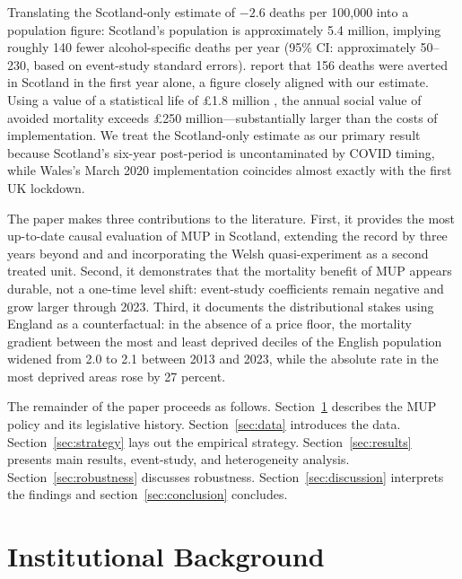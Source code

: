 \documentclass[12pt]{article}
\begin{document}
Translating the Scotland-only estimate of $-2.6$ deaths per 100,000 into a population figure: Scotland's population is approximately 5.4 million, implying roughly 140 fewer alcohol-specific deaths per year (95\% CI: approximately 50--230, based on event-study standard errors). \citet{Giles2024} report that 156 deaths were averted in Scotland in the first year alone, a figure closely aligned with our estimate. Using a value of a statistical life of \pounds{}1.8 million \citep{DFTVSLY}, the annual social value of avoided mortality exceeds \pounds{}250 million---substantially larger than the costs of implementation. We treat the Scotland-only estimate as our primary result because Scotland's six-year post-period is uncontaminated by COVID timing, while Wales's March 2020 implementation coincides almost exactly with the first UK lockdown.

The paper makes three contributions to the literature. First, it provides the most up-to-date causal evaluation of MUP in Scotland, extending the record by three years beyond \citet{ODonnell2019} and \citet{Giles2024} and incorporating the Welsh quasi-experiment as a second treated unit. Second, it demonstrates that the mortality benefit of MUP appears durable, not a one-time level shift: event-study coefficients remain negative and grow larger through 2023. Third, it documents the distributional stakes using England as a counterfactual: in the absence of a price floor, the mortality gradient between the most and least deprived deciles of the English population widened from 2.0 to 2.1 between 2013 and 2023, while the absolute rate in the most deprived areas rose by 27 percent.

The remainder of the paper proceeds as follows. Section~\ref{sec:background} describes the MUP policy and its legislative history. Section~\ref{sec:data} introduces the data. Section~\ref{sec:strategy} lays out the empirical strategy. Section~\ref{sec:results} presents main results, event-study, and heterogeneity analysis. Section~\ref{sec:robustness} discusses robustness. Section~\ref{sec:discussion} interprets the findings and section~\ref{sec:conclusion} concludes.

\section{Institutional Background}
\label{sec:background}
\end{document}
